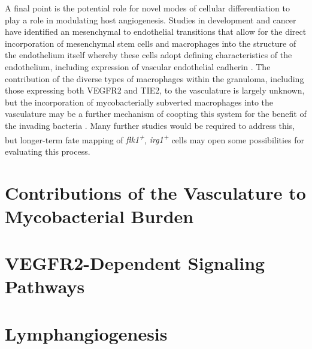 A final point is the potential role for novel modes of cellular differentiation to play a role in modulating host angiogenesis. Studies in development and cancer have identified an mesenchymal to endothelial transitions that allow for the direct incorporation of mesenchymal stem cells and macrophages into the structure of the endothelium itself whereby these cells adopt defining characteristics of the endothelium, including expression of vascular endothelial cadherin \citep{Ubil2014, Wu2007, Zhang2008b}. The contribution of the diverse types of macrophages within the granuloma, including those expressing both VEGFR2 and TIE2, to the vasculature is largely unknown, but the incorporation of mycobacterially subverted macrophages into the vasculature may be a further mechanism of coopting this system for the benefit of the invading bacteria \citep{deCortie2014, Hall2012}. Many further studies would be required to address this, but longer\hyp{}term fate mapping of \textit{flk1\textsuperscript{+}}, \textit{irg1\textsuperscript{+}} cells may open some possibilities for evaluating this process.

\section{Contributions of the Vasculature to Mycobacterial Burden}

\section{VEGFR2\hyp{}Dependent Signaling Pathways}

\section{Lymphangiogenesis}\label{lymphangiogenesis}

